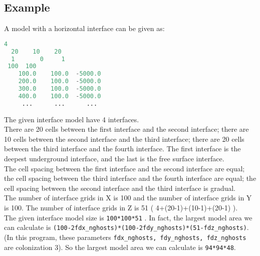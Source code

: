 \subsection{Example}

A model with a horizontal interface can be given as:

\begin{lstlisting}[language=python, title=test.gdlay, frame=tb]
  4
  20    10    20
  1       0     1    
 100  100
    100.0    100.0  -5000.0   
    200.0    100.0  -5000.0
    300.0    100.0  -5000.0
    400.0    100.0  -5000.0
     ...      ...      ... 
\end{lstlisting}
The given interface model have 4 interfaces. \\
There are 20 cells between the first interface and the second interface; there are 10 cells between the second interface and the third interface; there are 20 cells between the third interface and the fourth interface. The first interface is the deepest underground interface, and the last is the free surface interface. \\
The cell spacing between the first interface and the second interface are equal; the cell spacing between the third interface and the fourth interface are equal; the cell spacing between the second interface and the third interface is gradual.\\
The number of interface grids in X is 100 and the number of interface grids in Y is 100. The number of interface grids in Z is 51 ( 4+(20-1)+(10-1)+(20-1) ). \\

The given interface model size is \texttt{100*100*51} .
In fact, the largest model area we can calculate is \texttt{(100-2\*fdx\_nghosts)*(100-2\*fdy\_nghosts)*(51-fdz\_nghosts)}. 
(In this program, these parameters \texttt{fdx\_nghosts, fdy\_nghosts, fdz\_nghosts} are colonization 3). So the largest model area we can calculate is \texttt{94*94*48}.  \\

